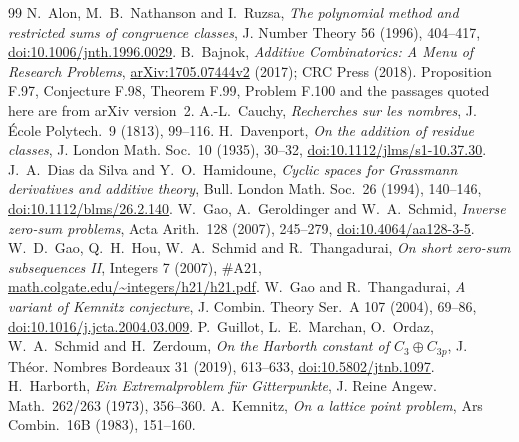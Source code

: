 \documentclass[11pt]{article}
\theoremstyle{remark}
\begin{document}
\begin{thebibliography}{99}
 N.~Alon, M.~B.~Nathanson and I.~Ruzsa, \emph{The polynomial method and restricted sums of congruence classes}, J. Number Theory 56 (1996), 404--417, \href{https://doi.org/10.1006/jnth.1996.0029}{doi:10.1006/jnth.1996.0029}.
 B.~Bajnok, \emph{Additive Combinatorics: A Menu of Research Problems}, \href{https://arxiv.org/abs/1705.07444v2}{arXiv:1705.07444v2} (2017); CRC Press (2018). Proposition F.97, Conjecture F.98, Theorem F.99, Problem F.100 and the passages quoted here are from arXiv version~2.
 A.-L.~Cauchy, \emph{Recherches sur les nombres}, J. École Polytech.\ 9 (1813), 99--116.
 H.~Davenport, \emph{On the addition of residue classes}, J. London Math. Soc.\ 10 (1935), 30--32, \href{https://doi.org/10.1112/jlms/s1-10.37.30}{doi:10.1112/jlms/s1-10.37.30}.
 J.~A.~Dias da Silva and Y.~O.~Hamidoune, \emph{Cyclic spaces for Grassmann derivatives and additive theory}, Bull. London Math. Soc.\ 26 (1994), 140--146, \href{https://doi.org/10.1112/blms/26.2.140}{doi:10.1112/blms/26.2.140}.
 W.~Gao, A.~Geroldinger and W.~A.~Schmid, \emph{Inverse zero-sum problems}, Acta Arith.\ 128 (2007), 245--279, \href{https://doi.org/10.4064/aa128-3-5}{doi:10.4064/aa128-3-5}.
 W.~D.~Gao, Q.~H.~Hou, W.~A.~Schmid and R.~Thangadurai, \emph{On short zero-sum subsequences II}, Integers 7 (2007), \#A21, \href{https://math.colgate.edu/~integers/h21/h21.pdf}{math.colgate.edu/\textasciitilde integers/h21/h21.pdf}.
 W.~Gao and R.~Thangadurai, \emph{A variant of Kemnitz conjecture}, J. Combin. Theory Ser.~A 107 (2004), 69--86, \href{https://doi.org/10.1016/j.jcta.2004.03.009}{doi:10.1016/j.jcta.2004.03.009}.
 P.~Guillot, L.~E.~Marchan, O.~Ordaz, W.~A.~Schmid and H.~Zerdoum, \emph{On the Harborth constant of $C_3\oplus C_{3p}$}, J. Théor. Nombres Bordeaux 31 (2019), 613--633, \href{https://doi.org/10.5802/jtnb.1097}{doi:10.5802/jtnb.1097}.
 H.~Harborth, \emph{Ein Extremalproblem für Gitterpunkte}, J. Reine Angew. Math.\ 262/263 (1973), 356--360.
 A.~Kemnitz, \emph{On a lattice point problem}, Ars Combin.\ 16B (1983), 151--160.
\end{thebibliography}
\end{document}
